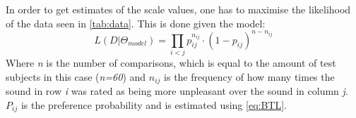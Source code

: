 In order to get estimates of the scale values, one has to maximise the likelihood of the data seen in \autoref{tab:data}. This is done given the model: 
%
\begin{equation}
L(D|\Theta_{model}) = \prod_{i<j} p_{ij} ^{n_{ij}}\cdot(1- p_{ij})^{n-n_{ij}}
\end{equation}
\noindent 
%
Where \textit{n} is the number of comparisons, which is equal to the amount of test subjects in this case (\textit{n=60}) and $n_{ij}$ is the frequency of how many times the sound in row \textit{i} was rated as being more unpleasant over the sound in column \textit{j}. $P_{ij}$ is the preference probability and is estimated using \autoref{eq:BTL}. 
\vfill
